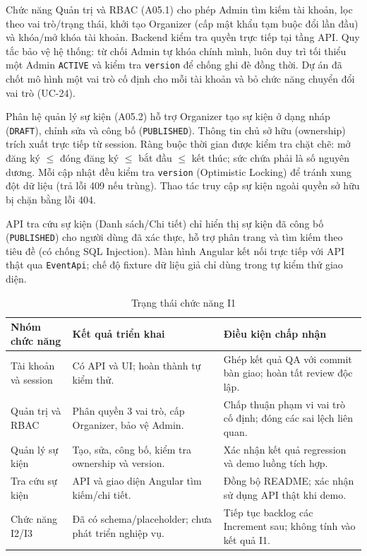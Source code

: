Chức năng Quản trị và RBAC (A05.1) cho phép Admin tìm kiếm tài khoản, lọc theo vai trò/trạng thái, khởi tạo Organizer (cấp mật khẩu tạm buộc đổi lần đầu) và khóa/mở khóa tài khoản. Backend kiểm tra quyền trực tiếp tại tầng API. Quy tắc bảo vệ hệ thống: từ chối Admin tự khóa chính mình, luôn duy trì tối thiểu một Admin \texttt{ACTIVE} và kiểm tra \texttt{version} để chống ghi đè đồng thời. Dự án đã chốt mô hình một vai trò cố định cho mỗi tài khoản và bỏ chức năng chuyển đổi vai trò (UC-24).


Phân hệ quản lý sự kiện (A05.2) hỗ trợ Organizer tạo sự kiện ở dạng nháp (\texttt{DRAFT}), chỉnh sửa và công bố (\texttt{PUBLISHED}). Thông tin chủ sở hữu (ownership) trích xuất trực tiếp từ session. Ràng buộc thời gian được kiểm tra chặt chẽ: mở đăng ký $\le$ đóng đăng ký $\le$ bắt đầu $\le$ kết thúc; sức chứa phải là số nguyên dương. Mỗi cập nhật đều kiểm tra \texttt{version} (Optimistic Locking) để tránh xung đột dữ liệu (trả lỗi 409 nếu trùng). Thao tác truy cập sự kiện ngoài quyền sở hữu bị chặn bằng lỗi 404.

API tra cứu sự kiện (Danh sách/Chi tiết) chỉ hiển thị sự kiện đã công bố (\texttt{PUBLISHED}) cho người dùng đã xác thực, hỗ trợ phân trang và tìm kiếm theo tiêu đề (có chống SQL Injection). Màn hình Angular kết nối trực tiếp với API thật qua \texttt{EventApi}; chế độ fixture dữ liệu giả chỉ dùng trong tự kiểm thử giao diện.

\begin{table}[H]
\centering\small
\caption{Trạng thái chức năng I1}\label{tab:i1-scope}
\begin{tabularx}{\linewidth}{@{}p{.18\linewidth}XX@{}}
\toprule
\textbf{Nhóm chức năng} & \textbf{Kết quả triển khai} & \textbf{Điều kiện chấp nhận}\\\midrule
Tài khoản và session & Có API và UI; hoàn thành tự kiểm thử. & Ghép kết quả QA với commit bàn giao; hoàn tất review độc lập.\\
Quản trị và RBAC & Phân quyền 3 vai trò, cấp Organizer, bảo vệ Admin. & Chấp thuận phạm vi vai trò cố định; đóng các sai lệch liên quan.\\
Quản lý sự kiện & Tạo, sửa, công bố, kiểm tra ownership và version. & Xác nhận kết quả regression và demo luồng tích hợp.\\
Tra cứu sự kiện & API và giao diện Angular tìm kiếm/chi tiết. & Đồng bộ README; xác nhận sử dụng API thật khi demo.\\
Chức năng I2/I3 & Đã có schema/placeholder; chưa phát triển nghiệp vụ. & Tiếp tục backlog các Increment sau; không tính vào kết quả I1.\\
\bottomrule
\end{tabularx}
\end{table}

